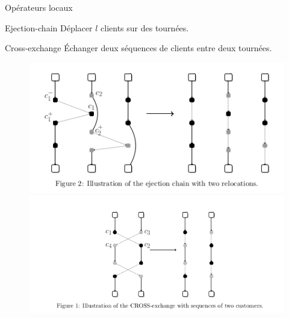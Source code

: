 \documentclass{beamer}
\begin{document}
\begin{frame}{Opérateurs locaux}
\begin{block}{Ejection-chain}
Déplacer $l$ clients sur des tournées. 
\end{block}
\begin{block}{Cross-exchange}
Échanger deux séquences de clients entre deux tournées. 
\end{block}
\begin{figure}
	\centering
	\includegraphics[scale=0.3]{ejection_chain.png}
	\includegraphics[scale=0.3]{cross_exchange.png}
\end{figure}

\end{frame}
\end{document}
